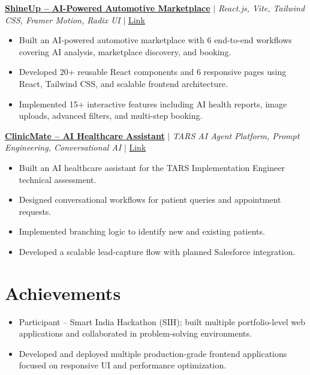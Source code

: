 \documentclass[letterpaper,10pt]{article}
\begin{document}
\vspace{2pt}

\textbf{\href{https://shine-up.netlify.app/}{ShineUp -- AI-Powered Automotive Marketplace}}
$|$ \emph{React.js, Vite, Tailwind CSS, Framer Motion, Radix UI}
$|$ \href{https://github.com/vivekbhattacharya01-gif/ShineUp}{Link}

\begin{itemize}[leftmargin=0.25in]
    \item Built an AI-powered automotive marketplace with 6 end-to-end workflows covering AI analysis, marketplace discovery, and booking.
    \item Developed 20+ reusable React components and 6 responsive pages using React, Tailwind CSS, and scalable frontend architecture.
    \item Implemented 15+ interactive features including AI health reports, image uploads, advanced filters, and multi-step booking.
\end{itemize}

\vspace{2pt}

\textbf{\href{https://neoagent.hellotars.com/chat/fcNwzt5z}{ClinicMate -- AI Healthcare Assistant}}
$|$ \emph{TARS AI Agent Platform, Prompt Engineering, Conversational AI}
$|$ \href{https://github.com/vivekbhattacharya01-gif/ClinicMate}{Link}

\begin{itemize}[leftmargin=0.25in]
    \item Built an AI healthcare assistant for the TARS Implementation Engineer technical assessment.
    \item Designed conversational workflows for patient queries and appointment requests.
    \item Implemented branching logic to identify new and existing patients.
    \item Developed a scalable lead-capture flow with planned Salesforce integration.
\end{itemize}

\vspace{-12pt}


\section{Achievements}

\begin{itemize}[leftmargin=0.15in]
    \item Participant -- Smart India Hackathon (SIH); built multiple portfolio-level web applications and collaborated in problem-solving environments.
    
    \item Developed and deployed multiple production-grade frontend applications focused on responsive UI and performance optimization.
\end{itemize}
\end{document}
